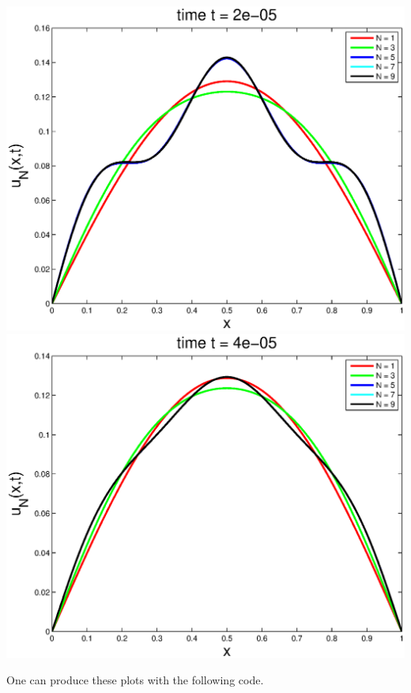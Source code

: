 \begin{solution}
\begin{enumerate}
\begin{center}
\includegraphics[scale=0.4]{fourth_c}
\includegraphics[scale=0.4]{fourth_d}
\end{center}

One can produce these plots with the following code.

\end{enumerate}
\end{solution}